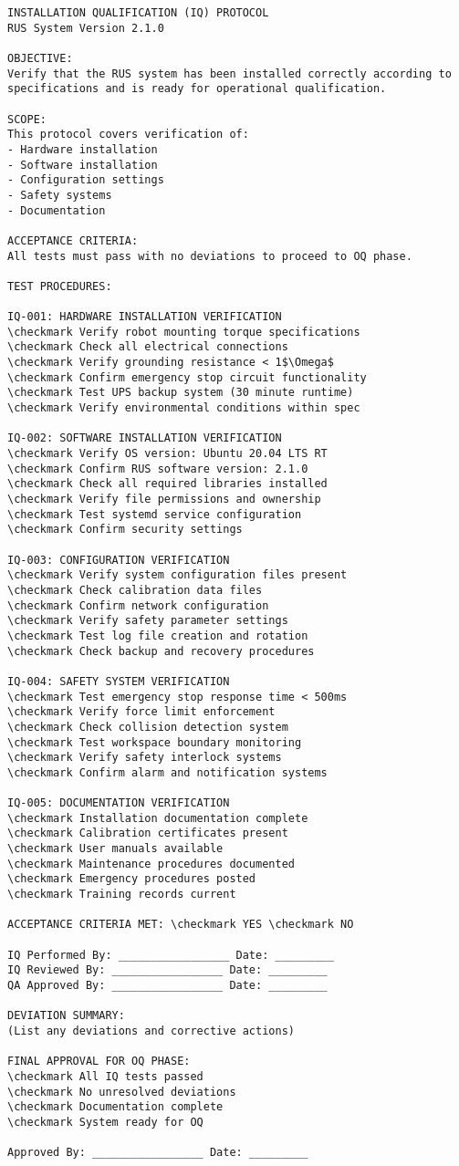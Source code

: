 \begin{lstlisting}[basicstyle=\ttfamily\footnotesize, caption={Installation Qualification Protocol}, label={lst:app-iq-protocol}]
INSTALLATION QUALIFICATION (IQ) PROTOCOL
RUS System Version 2.1.0

OBJECTIVE:
Verify that the RUS system has been installed correctly according to 
specifications and is ready for operational qualification.

SCOPE:
This protocol covers verification of:
- Hardware installation
- Software installation  
- Configuration settings
- Safety systems
- Documentation

ACCEPTANCE CRITERIA:
All tests must pass with no deviations to proceed to OQ phase.

TEST PROCEDURES:

IQ-001: HARDWARE INSTALLATION VERIFICATION
\checkmark Verify robot mounting torque specifications
\checkmark Check all electrical connections
\checkmark Verify grounding resistance < 1$\Omega$
\checkmark Confirm emergency stop circuit functionality
\checkmark Test UPS backup system (30 minute runtime)
\checkmark Verify environmental conditions within spec

IQ-002: SOFTWARE INSTALLATION VERIFICATION  
\checkmark Verify OS version: Ubuntu 20.04 LTS RT
\checkmark Confirm RUS software version: 2.1.0
\checkmark Check all required libraries installed
\checkmark Verify file permissions and ownership
\checkmark Test systemd service configuration
\checkmark Confirm security settings

IQ-003: CONFIGURATION VERIFICATION
\checkmark Verify system configuration files present
\checkmark Check calibration data files
\checkmark Confirm network configuration
\checkmark Verify safety parameter settings
\checkmark Test log file creation and rotation
\checkmark Check backup and recovery procedures

IQ-004: SAFETY SYSTEM VERIFICATION
\checkmark Test emergency stop response time < 500ms
\checkmark Verify force limit enforcement
\checkmark Check collision detection system
\checkmark Test workspace boundary monitoring
\checkmark Verify safety interlock systems
\checkmark Confirm alarm and notification systems

IQ-005: DOCUMENTATION VERIFICATION
\checkmark Installation documentation complete
\checkmark Calibration certificates present
\checkmark User manuals available
\checkmark Maintenance procedures documented
\checkmark Emergency procedures posted
\checkmark Training records current

ACCEPTANCE CRITERIA MET: \checkmark YES \checkmark NO

IQ Performed By: _________________ Date: _________
IQ Reviewed By: _________________ Date: _________
QA Approved By: _________________ Date: _________

DEVIATION SUMMARY:
(List any deviations and corrective actions)

FINAL APPROVAL FOR OQ PHASE:
\checkmark All IQ tests passed
\checkmark No unresolved deviations  
\checkmark Documentation complete
\checkmark System ready for OQ

Approved By: _________________ Date: _________
\end{lstlisting}

